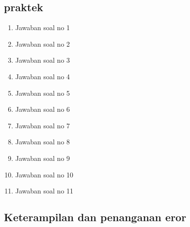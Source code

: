 \subsection{praktek}
\begin{enumerate}
    \item Jawaban soal no 1
    
    \item Jawaban soal no 2
    
    \item Jawaban soal no 3
    
    \item Jawaban soal no 4
    
    \item Jawaban soal no 5
    
    \item Jawaban soal no 6
    
    \item Jawaban soal no 7
    
    \item Jawaban soal no 8
    
    \item Jawaban soal no 9
    
    \item Jawaban soal no 10
    
    \item Jawaban soal no 11
    
\end{enumerate}

\subsection{Keterampilan dan penanganan eror}
    